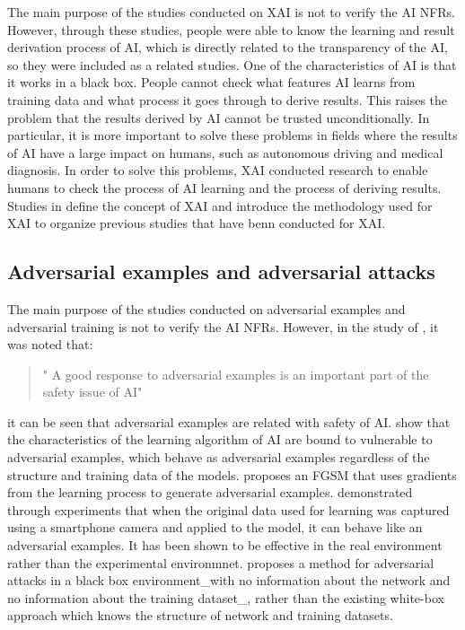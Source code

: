 \documentclass[journal,article,submit,moreauthors,pdftex]{Definitions/mdpi}
\begin{document}
The main purpose of the studies conducted on XAI is not to verify the AI NFRs.
However, through these studies, people were able to know the learning and result derivation process of AI, which is directly related to the transparency of the AI, so they were included as a related studies.
One of the characteristics of AI is that it works in a black box. People cannot check what features AI learns from training data and what process it goes through to derive results.
This raises the problem that the results derived by AI cannot be trusted unconditionally.
In particular, it is more important to solve these problems in fields where the results of AI have a large impact on humans, such as autonomous driving and medical diagnosis.
In order to solve this problems, XAI conducted research to enable humans to check the process of AI learning and the process of deriving results.
Studies in \cite{xai-samek, xai-arrieta} define the concept of XAI and introduce the methodology used for XAI to organize previous studies that have benn conducted for XAI.

\subsection{Adversarial examples and adversarial attacks}

The main purpose of the studies conducted on adversarial examples and adversarial training is not to verify the AI NFRs.
However, in the study of \cite{adversarial-kurakin}, it was noted that:
\begin{quote}
   " A good response to adversarial examples is an important part of the safety issue of AI"
\end{quote}
it can be seen that adversarial examples are related with safety of AI.
\cite{adversarial-szegedy,adversarial-goodfellow} show that the characteristics of the learning algorithm of AI are bound to vulnerable to adversarial examples, which behave as adversarial examples regardless of the structure and training data of the models.
\cite{adversarial-goodfellow} proposes an FGSM that uses gradients from the learning process to generate adversarial examples.
\cite{adversarial-kurakin2} demonstrated through experiments that when the original data used for learning was captured using a smartphone camera and applied to the model, it can behave like an adversarial examples. It has been shown to be effective in the real environment rather than the experimental environmnet.
\cite{adversarial-papernot} proposes a method for adversarial attacks in a black box environment\_with no information about the network and no information about the training dataset\_, rather than the existing white-box approach which knows the structure of network and training datasets.
\end{document}
